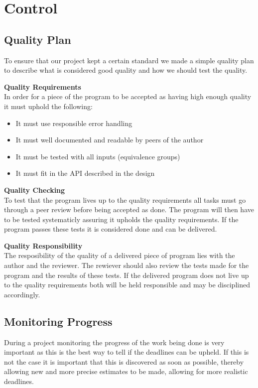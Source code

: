 \section{Control}
\subsection{Quality Plan}
To ensure that our project kept a certain standard we made a simple quality plan to describe what is considered good quality and how we should test the quality.

\textbf{Quality Requirements}\\
In order for a piece of the program to be accepted as having high enough quality it must uphold the following:
\begin{itemize}
\item It must use responsible error handling
\item It must well documented and readable by peers of the author
\item It must be tested with all inputs (equivalence groups)
\item It must fit in the API described in the design
\end{itemize}


\textbf{Quality Checking}\\
To test that the program lives up to the quality requirements all tasks must go through a peer review before being accepted as done. The program will then have to be tested systematicly assuring it upholds the quality requirements. If the program passes these tests it is considered done and can be delivered.

\textbf{Quality Responsibility}\\
The resposibility of the quality of a delivered piece of program lies with the author and the reviewer. The rewiever should also review the tests made for the program and the results of these tests. If the delivered program does not live up to the quality requirements both will be held responsible and may be disciplined accordingly.

\subsection{Monitoring Progress}
During a project monitoring the progress of the work being done is very important as this is the best way to tell if the deadlines can be upheld. If this is not the case it is important that this is discovered as soon as possible, thereby allowing new and more precise estimates to be made, allowing for more realistic deadlines.

